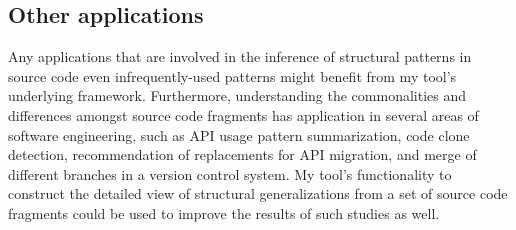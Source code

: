 \subsection{Other applications}
Any applications that are involved in the inference of structural patterns in source code even infrequently-used patterns might benefit from my tool's underlying framework.
Furthermore, understanding the commonalities and differences amongst source code fragments has application in several areas of software engineering, such as API usage pattern summarization, code clone detection, recommendation of replacements for API migration, and merge of different branches in a version control system. My tool's functionality to construct the detailed view of structural generalizations from a set of source code fragments could be used to improve the results of such studies as well.



